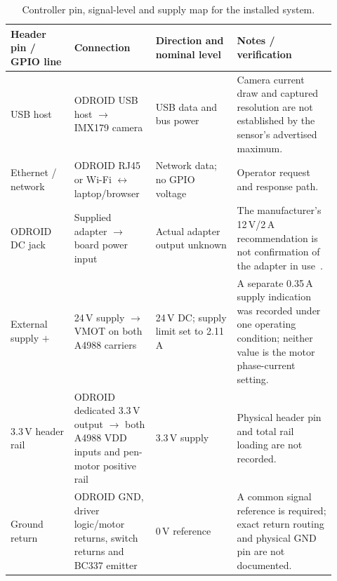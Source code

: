 \begin{table}[!htbp]\centering\small
\setlength{\tabcolsep}{3pt}\renewcommand{\arraystretch}{1.03}
\begin{tabular}{p{0.18\linewidth}p{0.22\linewidth}p{0.23\linewidth}p{0.29\linewidth}}\toprule
\textbf{Header pin / GPIO line} & \textbf{Connection} & \textbf{Direction and nominal level} & \textbf{Notes / verification}\\\midrule
USB host & ODROID USB host $\rightarrow$ IMX179 camera & USB data and bus power & Camera current draw and captured resolution are not established by the sensor's advertised maximum.\\
Ethernet / network & ODROID RJ45 or Wi-Fi $\leftrightarrow$ laptop/browser & Network data; no GPIO voltage & Operator request and response path.\\
ODROID DC jack & Supplied adapter $\rightarrow$ board power input & Actual adapter output unknown & The manufacturer's 12\,V/2\,A recommendation is not confirmation of the adapter in use~\cite{odroidn2ds}.\\
External supply $+$ & 24\,V supply $\rightarrow$ VMOT on both A4988 carriers & 24\,V DC; supply limit set to 2.11\,A & A separate 0.35\,A supply indication was recorded under one operating condition; neither value is the motor phase-current setting.\\
3.3\,V header rail & ODROID dedicated 3.3\,V output $\rightarrow$ both A4988 VDD inputs and pen-motor positive rail & 3.3\,V supply & Physical header pin and total rail loading are not recorded.\\
Ground return & ODROID GND, driver logic/motor returns, switch returns and BC337 emitter & 0\,V reference & A common signal reference is required; exact return routing and physical GND pin are not documented.\\
\bottomrule\end{tabular}
\caption{Controller pin, signal-level and supply map for the installed system.}\label{tab:des-pin-map}
\end{table}

